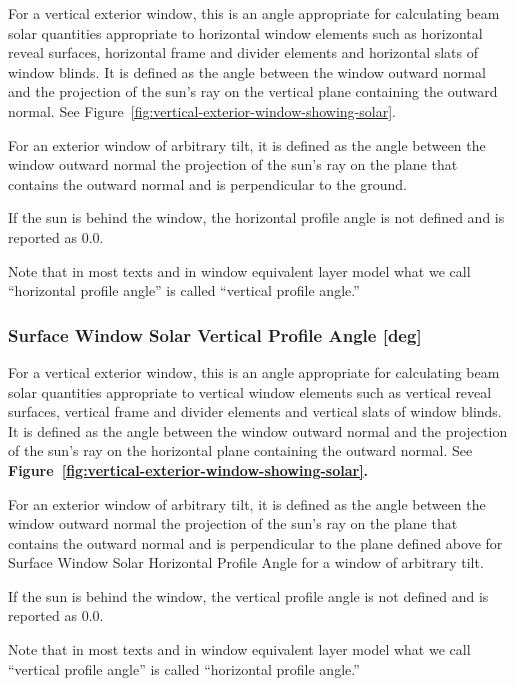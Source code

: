 For a vertical exterior window, this is an angle appropriate for calculating beam solar quantities appropriate to horizontal window elements such as horizontal reveal surfaces, horizontal frame and divider elements and horizontal slats of window blinds. It is defined as the angle between the window outward normal and the projection of the sun's ray on the vertical plane containing the outward normal. See Figure~\ref{fig:vertical-exterior-window-showing-solar}.

For an exterior window of arbitrary tilt, it is defined as the angle between the window outward normal the projection of the sun's ray on the plane that contains the outward normal and is perpendicular to the ground.

If the sun is behind the window, the horizontal profile angle is not defined and is reported as 0.0.

Note that in most texts and in window equivalent layer model what we call ``horizontal profile angle'' is called ``vertical profile angle.''

\subsubsection{Surface Window Solar Vertical Profile Angle {[}deg{]}}\label{surface-window-solar-vertical-profile-angle-deg}

For a vertical exterior window, this is an angle appropriate for calculating beam solar quantities appropriate to vertical window elements such as vertical reveal surfaces, vertical frame and divider elements and vertical slats of window blinds. It is defined as the angle between the window outward normal and the projection of the sun's ray on the horizontal plane containing the outward normal. See \textbf{Figure~\ref{fig:vertical-exterior-window-showing-solar}.}

For an exterior window of arbitrary tilt, it is defined as the angle between the window outward normal the projection of the sun's ray on the plane that contains the outward normal and is perpendicular to the plane defined above for Surface Window Solar Horizontal Profile Angle for a window of arbitrary tilt.

If the sun is behind the window, the vertical profile angle is not defined and is reported as 0.0.

Note that in most texts and in window equivalent layer model what we call ``vertical profile angle'' is called ``horizontal profile angle.''

